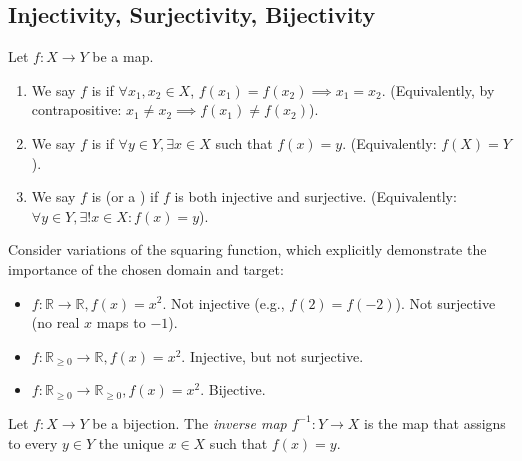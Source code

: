 \subsection{Injectivity, Surjectivity, Bijectivity}

\begin{definition}
\label{def:injective_surjective_bijective}
Let $f: X \to Y$ be a map.
\begin{enumerate}
    \item We say $f$ is  if $\forall x_1, x_2 \in X$, $f(x_1) = f(x_2) \implies x_1 = x_2$. (Equivalently, by contrapositive: $x_1 \ne x_2 \implies f(x_1) \ne f(x_2)$).
    \item We say $f$ is  if $\forall y \in Y, \exists x \in X$ such that $f(x) = y$. (Equivalently: $f(X) = Y$).
    \item We say $f$ is  (or a ) if $f$ is both injective and surjective. (Equivalently: $\forall y \in Y, \exists! x \in X : f(x) = y$).
\end{enumerate}
\end{definition}

\begin{example}
Consider variations of the squaring function, which explicitly demonstrate the importance of the chosen domain and target:
\begin{itemize}
    \item $f: \mathbb{R} \to \mathbb{R}, f(x) = x^2$. Not injective (e.g., $f(2) = f(-2)$). Not surjective (no real $x$ maps to $-1$).
    \item $f: \mathbb{R}_{\ge 0} \to \mathbb{R}, f(x) = x^2$. Injective, but not surjective.
    \item $f: \mathbb{R}_{\ge 0} \to \mathbb{R}_{\ge 0}, f(x) = x^2$. Bijective.
\end{itemize}
\end{example}

\begin{definition}
\label{def:inverse_map}
Let $f: X \to Y$ be a bijection. The \textit{inverse map} $f^{-1}: Y \to X$ is the map that assigns to every $y \in Y$ the unique $x \in X$ such that $f(x) = y$.
\end{definition}

